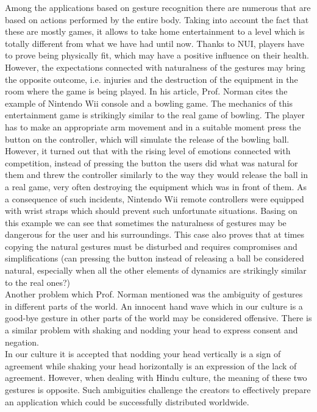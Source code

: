 \documentclass{jacsart}
\begin{document}
\indent Among the applications based on gesture recognition there are numerous that are based on actions performed by the entire body. Taking into account the fact that these are mostly games, it allows to take home entertainment to a level which is totally different from what we have had until now. Thanks to NUI, players have to prove being physically fit, which may have a positive influence on their health. However, the expectations connected with naturalness of the gestures may bring the opposite outcome, i.e. injuries and the destruction of the equipment in the room where the game is being played.  In his article, Prof. Norman cites the example of Nintendo Wii console and a bowling game. The mechanics of this entertainment game is strikingly similar to the real game of bowling. The player has to make an appropriate arm movement and in a suitable moment press the button on the controller, which will simulate the release of the bowling ball. However, it turned out that with the rising level of emotions connected with competition, instead of pressing the button the users did what was natural for them and threw the controller similarly to the way they would release the ball in a real game, very often destroying the equipment which was in front of them. As a consequence of such incidents, Nintendo Wii remote controllers were equipped with wrist straps which should prevent such unfortunate situations. Basing on this example we can see that sometimes the naturalness of gestures may be dangerous for the user and his surroundings. This case also proves that at times copying the natural gestures must be disturbed and requires compromises and simplifications (can pressing the button instead of releasing a ball be considered natural, especially when all the other elements of dynamics are strikingly similar to the real ones?)\\
\indent Another problem which Prof. Norman mentioned was the ambiguity of gestures in different parts of the world. An innocent hand wave which in our culture is a good-bye gesture in other parts of the world may be considered offensive. There is a similar problem with shaking and nodding your head to express consent and negation.\\
\indent In our culture it is accepted that nodding your head vertically is a sign of agreement while shaking your head horizontally is an expression of the lack of agreement. However, when dealing with Hindu culture, the meaning of these two gestures is opposite. Such ambiguities challenge the creators to effectively prepare an application which could be successfully distributed worldwide.\\
\end{document}
